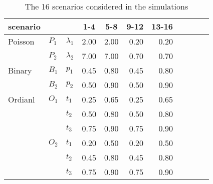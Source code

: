 \documentclass[letterpaper]{article}
\begin{document}
\begin{table}[h]
\centering
\caption{The 16 scenarios considered in the simulations}
\begin{tabular}{@{}lllrrrrrrrr@{}}
\hline
scenario &       &             & \multicolumn{1}{c}{1-4} & \multicolumn{1}{c}{5-8} & \multicolumn{1}{c}{9-12} & \multicolumn{1}{c}{13-16} \\ \hline
Poisson  & $P_1$ & $\lambda_1$ & 2.00                    & 2.00                    & 0.20                     & 0.20                      \\
         & $P_2$ & $\lambda_2$ & 7.00                    & 7.00                    & 0.70                     & 0.70                      \\
Binary   & $B_1$ & $p_1$       & 0.45                    & 0.80                    & 0.45                     & 0.80                      \\
         & $B_2$ & $p_2$       & 0.50                    & 0.90                    & 0.50                     & 0.90                      \\
Ordianl  & $O_1$ & $t_{1}$     & 0.25                    & 0.65                    & 0.25                     & 0.65                      \\
         &       & $t_{2}$     & 0.50                    & 0.80                    & 0.50                     & 0.80                      \\
         &       & $t_{3}$     & 0.75                    & 0.90                    & 0.75                     & 0.90                      \\
         & $O_2$ & $t_{1}$     & 0.20                    & 0.50                    & 0.20                     & 0.50                      \\
         &       & $t_{2}$     & 0.45                    & 0.80                    & 0.45                     & 0.80                      \\
         &       & $t_{3}$     & 0.75                    & 0.90                    & 0.75                     & 0.90                      \\ \hline
\end{tabular}
\end{table}
\end{document}
